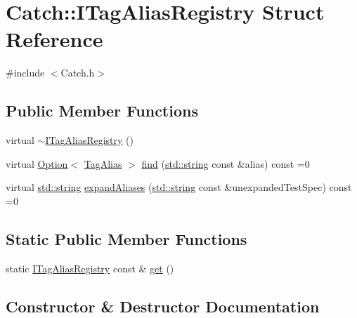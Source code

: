 \hypertarget{struct_catch_1_1_i_tag_alias_registry}{}\section{Catch\+:\+:I\+Tag\+Alias\+Registry Struct Reference}
\label{struct_catch_1_1_i_tag_alias_registry}


{\ttfamily \#include $<$Catch.\+h$>$}

\subsection*{Public Member Functions}
\begin{DoxyCompactItemize}
\item 
virtual \hyperlink{struct_catch_1_1_i_tag_alias_registry_a8967db4dd40b68e22697eff0f4928239}{$\sim$\+I\+Tag\+Alias\+Registry} ()
\item 
virtual \hyperlink{class_catch_1_1_option}{Option}$<$ \hyperlink{struct_catch_1_1_tag_alias}{Tag\+Alias} $>$ \hyperlink{struct_catch_1_1_i_tag_alias_registry_ad632d35cd51f123d1dbf667e1a8a0d65}{find} (\hyperlink{_s_d_l__opengl__glext_8h_ae84541b4f3d8e1ea24ec0f466a8c568b}{std\+::string} const \&alias) const  =0
\item 
virtual \hyperlink{_s_d_l__opengl__glext_8h_ae84541b4f3d8e1ea24ec0f466a8c568b}{std\+::string} \hyperlink{struct_catch_1_1_i_tag_alias_registry_a2074875f376ff60fb52e7db80421b09c}{expand\+Aliases} (\hyperlink{_s_d_l__opengl__glext_8h_ae84541b4f3d8e1ea24ec0f466a8c568b}{std\+::string} const \&unexpanded\+Test\+Spec) const  =0
\end{DoxyCompactItemize}
\subsection*{Static Public Member Functions}
\begin{DoxyCompactItemize}
\item 
static \hyperlink{struct_catch_1_1_i_tag_alias_registry}{I\+Tag\+Alias\+Registry} const \& \hyperlink{struct_catch_1_1_i_tag_alias_registry_aa9d0f008f49473389c7abf6071f137a7}{get} ()
\end{DoxyCompactItemize}


\subsection{Constructor \& Destructor Documentation}
